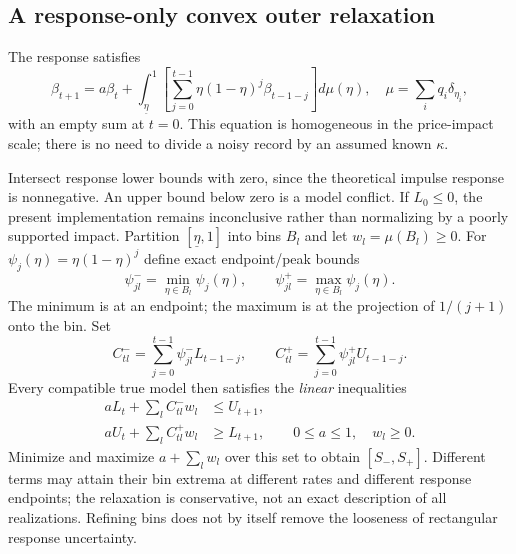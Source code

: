 \documentclass[11pt,a4paper]{article}
\theoremstyle{definition}
\theoremstyle{remark}
\begin{document}
\subsection{A response-only convex outer relaxation}
The response satisfies
\begin{equation}
 \beta_{t+1}=a\beta_t+\int_{\underline\eta}^{1}
 \left[\sum_{j=0}^{t-1}\eta(1-\eta)^j\beta_{t-1-j}\right]d\mu(\eta),
 \quad \mu=\sum_iq_i\delta_{\eta_i},
 \label{eq:public_recurrence}
\end{equation}
with an empty sum at $t=0$. This equation is homogeneous in the price-impact scale; there is no need to divide a noisy record by an assumed known $\kappa$.

Intersect response lower bounds with zero, since the theoretical impulse response is nonnegative. An upper bound below zero is a model conflict. If $L_0\le0$, the present implementation remains inconclusive rather than normalizing by a poorly supported impact. Partition $[\underline\eta,1]$ into bins $B_l$ and let $w_l=\mu(B_l)\ge0$. For $\psi_j(\eta)=\eta(1-\eta)^j$ define exact endpoint/peak bounds
\[
 \psi_{jl}^-=\min_{\eta\in B_l}\psi_j(\eta),\qquad
 \psi_{jl}^+=\max_{\eta\in B_l}\psi_j(\eta).
\]
The minimum is at an endpoint; the maximum is at the projection of $1/(j+1)$ onto the bin. Set
\begin{equation}
 C_{tl}^-=\sum_{j=0}^{t-1}\psi_{jl}^-L_{t-1-j},\qquad
 C_{tl}^+=\sum_{j=0}^{t-1}\psi_{jl}^+U_{t-1-j}.
\end{equation}
Every compatible true model then satisfies the \emph{linear} inequalities
\begin{align}
 aL_t+\sum_l C_{tl}^-w_l&\le U_{t+1},\\
 aU_t+\sum_l C_{tl}^+w_l&\ge L_{t+1},\qquad 0\le a\le1,
 \quad w_l\ge0.
 \label{eq:price_outer}
\end{align}
Minimize and maximize $a+\sum_lw_l$ over this set to obtain $[S_-,S_+]$. Different terms may attain their bin extrema at different rates and different response endpoints; the relaxation is conservative, not an exact description of all realizations. Refining bins does not by itself remove the looseness of rectangular response uncertainty.
\end{document}
